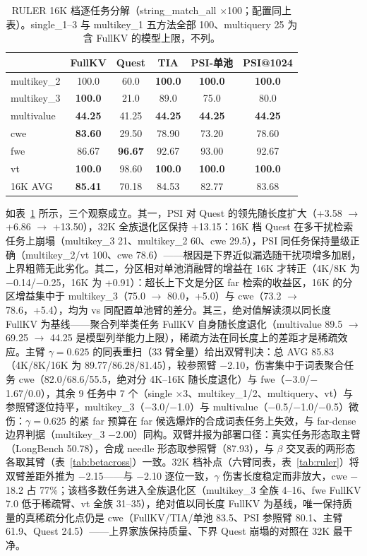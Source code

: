 \documentclass[11pt]{article}
\begin{document}
\begin{table}[h]\centering
\small\setlength{\tabcolsep}{4pt}
\caption{RULER 16K 档逐任务分解（string\_match\_all $\times$100；配置同上表）。single\_1--3 与 multikey\_1 五方法全部 100、multiquery 25 为含 FullKV 的模型上限，不列。}
\label{tab:ruler16k}
\begin{tabular}{lccccc}
\toprule
 & FullKV & Quest & TIA & PSI-单池 & PSI@1024 \\
\midrule
multikey\_2 & 100.0 & 60.0 & \textbf{100.0} & \textbf{100.0} & \textbf{100.0} \\
multikey\_3 & \textbf{100.0} & 21.0 & 89.0 & 75.0 & 80.0 \\
multivalue & \textbf{44.25} & 41.25 & \textbf{44.25} & \textbf{44.25} & \textbf{44.25} \\
cwe & \textbf{83.60} & 29.50 & 78.90 & 73.20 & 78.60 \\
fwe & 86.67 & \textbf{96.67} & 92.67 & 93.00 & 92.67 \\
vt & \textbf{100.0} & 98.60 & \textbf{100.0} & \textbf{100.0} & \textbf{100.0} \\
16K AVG & \textbf{85.41} & 70.18 & 84.53 & 82.77 & 83.68 \\
\bottomrule
\end{tabular}
\end{table}

如表~\ref{tab:ruler16k} 所示，三个观察成立。其一，PSI 对 Quest 的领先随长度扩大（+3.58 $\rightarrow$ +6.86 $\rightarrow$ +13.50），32K 全族退化区保持 +13.15：16K 档 Quest 在多干扰检索任务上崩塌（multikey\_3 21、multikey\_2 60、cwe 29.5），PSI 同任务保持量级正确（multikey\_2/vt 100、cwe 78.6）——根因是下界近似漏选随干扰项增多加剧，上界粗筛无此劣化。其二，分区相对单池消融臂的增益在 16K 才转正（4K/8K 为 $-$0.14/$-$0.25，16K 为 +0.91）：超长上下文是分区 far 检索的收益区，16K 的分区增益集中于 multikey\_3（75.0 $\rightarrow$ 80.0，+5.0）与 cwe（73.2 $\rightarrow$ 78.6，+5.4），均为 vs 同配置单池臂的差分。其三，绝对值解读须以同长度 FullKV 为基线——聚合列举类任务 FullKV 自身随长度退化（multivalue 89.5 $\rightarrow$ 69.25 $\rightarrow$ 44.25 是模型列举能力上限），稀疏方法在同长度上的差距才是稀疏效应。主臂 $\gamma{=}0.625$ 的同表重扫（33 臂全量）给出双臂判决：总 AVG 85.83（4K/8K/16K 为 89.77/86.28/81.45），较参照臂 $-$2.10，伤害集中于词表聚合任务 cwe（82.0/68.6/55.5，绝对分 4K--16K 随长度退化）与 fwe（$-$3.0/$-$1.67/0.0），其余 9 任务中 7 个（single $\times$3、multikey\_1/2、multiquery、vt）与参照臂逐位持平，multikey\_3（$-$3.0/$-$1.0）与 multivalue（$-$0.5/$-$1.0/$-$0.5）微伤：$\gamma{=}0.625$ 的紧 far 预算在 far 候选爆炸的合成词表任务上失效，与 far-dense 边界判据（multikey\_3 $-$2.00）同构。双臂并报为部署口径：真实任务形态取主臂（LongBench 50.78），合成 needle 形态取参照臂（87.93），与 $\beta$ 交叉表的两形态各取其臂（表~\ref{tab:betacross}）一致。32K 档补点（六臂同表，表~\ref{tab:ruler}）将双臂差距外推为 $-$2.15——与 $-$2.10 逐位一致，$\gamma$ 伤害长度稳定而非放大，cwe $-$18.2 占 77\%；该档多数任务进入全族退化区（multikey\_3 全族 4--16、fwe FullKV 7.0 低于稀疏臂、vt 全族 31--35），绝对值以同长度 FullKV 为基线，唯一保持质量的真稀疏分化点仍是 cwe（FullKV/TIA/单池 83.5、PSI 参照臂 80.1、主臂 61.9、Quest 24.5）——上界家族保持质量、下界 Quest 崩塌的对照在 32K 最干净。
\end{document}

